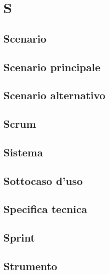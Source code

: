 \section{S} 
\subsection{Scenario} 

\subsection{Scenario principale} 

\subsection{Scenario alternativo} 

\subsection{Scrum} 

\subsection{Sistema} 

\subsection{Sottocaso d'uso} 

\subsection{Specifica tecnica} 

\subsection{Sprint} 

\subsection{Strumento} 

